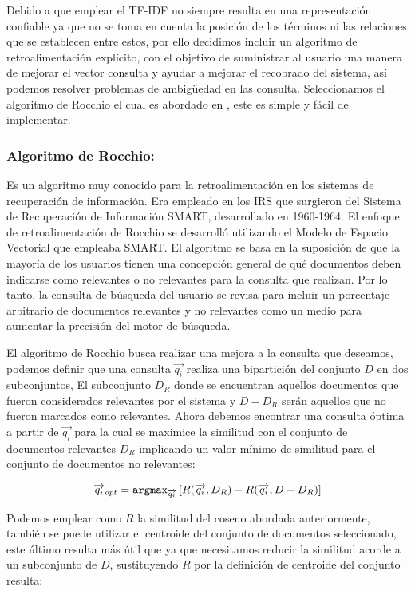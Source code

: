 \documentclass[runningheads,a4paper]{llncs}
\begin{document}
Debido a que emplear el TF-IDF no siempre resulta en una representación confiable ya que no se toma en cuenta la posición de los términos ni las relaciones que se establecen entre estos, por ello decidimos incluir un algoritmo de retroalimentación explícito, con el objetivo de suministrar al usuario una manera de mejorar el vector consulta y ayudar a mejorar el recobrado del sistema, así podemos resolver problemas de ambigüedad en las consulta. Seleccionamos el algoritmo de Rocchio el cual es abordado en \cite{rocchio}, este es simple y fácil de implementar.

\subsubsection*{Algoritmo de Rocchio:} Es un algoritmo muy conocido para la retroalimentación en los sistemas de recuperación de información. Era empleado en los IRS que surgieron del Sistema de Recuperación de Información SMART, desarrollado en 1960-1964. El enfoque de retroalimentación de Rocchio se desarrolló utilizando el Modelo de Espacio Vectorial que empleaba SMART. El algoritmo se basa en la suposición de que la mayoría de los usuarios tienen una concepción general de qué documentos deben indicarse como relevantes o no relevantes para la consulta que realizan. Por lo tanto, la consulta de búsqueda del usuario se revisa para incluir un porcentaje arbitrario de documentos relevantes y no relevantes como un medio para aumentar la precisión del motor de búsqueda.

El algoritmo de Rocchio busca realizar una mejora a la consulta que deseamos, podemos definir que una consulta  $\overrightarrow{q_i}$ realiza una bipartición del conjunto $D$ en dos subconjuntos, El subconjunto $D_R$ donde se encuentran aquellos documentos que fueron considerados relevantes por el sistema y $D - D_R$ serán aquellos que no fueron marcados como relevantes. Ahora debemos encontrar una consulta óptima a partir de $\overrightarrow{q_i}$ para la cual se maximice la similitud con el conjunto de documentos relevantes $D_R$ implicando un valor mínimo de similitud para el conjunto de documentos no relevantes:

\begin{equation}
	\overrightarrow{{q_i}}_{opt} = \verb*|argmax|_{\overrightarrow{q_i}} \left[ R(\overrightarrow{q_i}, D_R) - R(\overrightarrow{q_i}, D - D_R) \right] 
\end{equation}

Podemos emplear como $R$ la similitud del coseno abordada anteriormente, también se puede utilizar el centroide del conjunto de documentos seleccionado, este último resulta más útil que ya que necesitamos reducir la similitud acorde a un subconjunto de $D$, sustituyendo $R$ por la definición de centroide del conjunto resulta:
\end{document}
